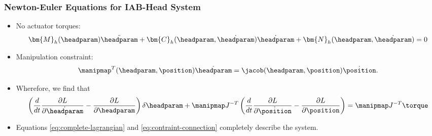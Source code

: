 \begin{frame}
	\frametitle{Newton-Euler Equations for IAB-Head System}
	\begin{itemize}
		\item No actuator torques:
		\begin{align}
		\bm{M}_h(\headparam) \ddot{\headparam}  + \bm{C}_h(\headparam, \dot{\headparam}) \dot{\headparam} + \bm{N}_h(\headparam, \dot{\headparam}) = 0
		\end{align}
		\item Manipulation constraint:
		\begin{align}
		\manipmap^T(\headparam, \position) \dot{\headparam}  = \jacob(\headparam, \position) \dot{\position}.
		\label{eq:contraint-connection}
		\end{align}
		\item Wherefore, we find that
		\begin{align}
		\left(\frac{d}{dt}\frac{\partial L}{\partial \dot{\headparam}} - \frac{\partial L}{\partial \headparam}  \right)\delta \headparam + \manipmap J^{-T}  \left(\frac{d}{dt}\frac{\partial L}{\partial \dot{\position}} - \frac{\partial L}{\partial \position}  \right) = \manipmap J^{-T}  \torque
		\label{eq:complete-lagrangian}
		\end{align}
		\item  Equations \eqref{eq:complete-lagrangian} and \eqref{eq:contraint-connection} completely describe the system.
	\end{itemize}
\end{frame}